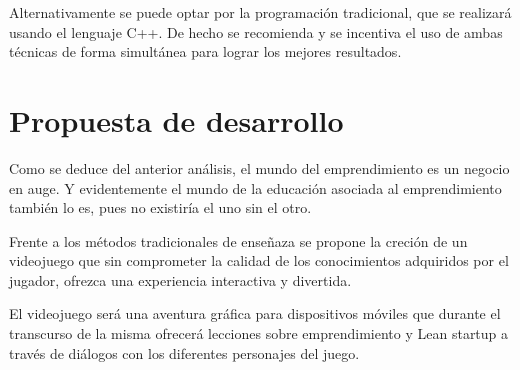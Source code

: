 Alternativamente se puede optar por la programación tradicional, que se realizará usando el lenguaje C++. De hecho se recomienda y se incentiva el uso de ambas técnicas de forma simultánea para lograr los mejores resultados.

\section{Propuesta de desarrollo}

Como se deduce del anterior análisis, el mundo del emprendimiento es un negocio en auge. Y evidentemente el mundo de la educación asociada al emprendimiento también lo es, pues no existiría el uno sin el otro.

Frente a los métodos tradicionales de enseñaza se propone la creción de un videojuego que sin comprometer la calidad de los conocimientos adquiridos por el jugador, ofrezca una experiencia interactiva y divertida.

El videojuego será una aventura gráfica para dispositivos móviles que durante el transcurso de la misma ofrecerá lecciones sobre emprendimiento y Lean startup a través de diálogos con los diferentes personajes del juego.